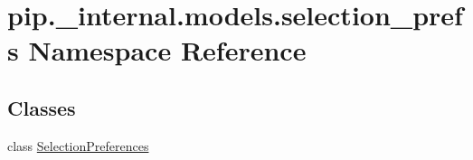 \hypertarget{namespacepip_1_1__internal_1_1models_1_1selection__prefs}{}\section{pip.\+\_\+internal.\+models.\+selection\+\_\+prefs Namespace Reference}
\label{namespacepip_1_1__internal_1_1models_1_1selection__prefs}
\subsection*{Classes}
\begin{DoxyCompactItemize}
\item 
class \hyperlink{classpip_1_1__internal_1_1models_1_1selection__prefs_1_1SelectionPreferences}{Selection\+Preferences}
\end{DoxyCompactItemize}
